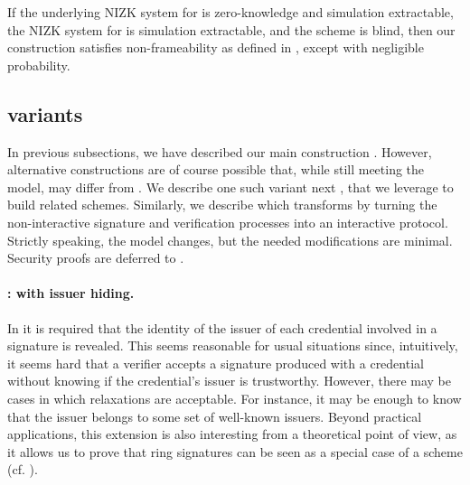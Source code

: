 
\begin{theorem}
  \label{thm:frame-uas}
  If the underlying NIZK system for \RelSig is zero-knowledge and simulation
  extractable, the NIZK system for \RelIns is simulation extractable, and the
  \SBCM scheme is blind, then our \CUASGen
  construction satisfies non-frameability as defined in ,
  except with negligible probability.
\end{theorem}

\subsection{\CUASGen variants}
\label{ssec:variants}

In previous subsections, we have described our main construction \CUASGen. 
However, alternative constructions are of course possible that, while
still meeting the \UAS model, may differ from \CUASGen. We describe one such
variant next \CUASGenHideIss, that we leverage to build related schemes.
%
Similarly, we describe \CUASGenInt which transforms \CUASGen by turning the
non-interactive signature and verification processes into an interactive
protocol. Strictly speaking, the model changes, but the needed modifications
are minimal.
%
Security proofs are deferred to .

\paragraph{\CUASGenHideIss: \RelSig with issuer hiding.} %
In \CUASGen it is required that the identity of the
issuer of each credential involved in a signature is revealed. This seems
reasonable for usual situations since, intuitively, it seems hard that a
verifier accepts a signature produced with a credential without knowing if the
credential's issuer is trustworthy. However, there may be cases in which
relaxations are acceptable. For instance, it may be enough to know that the
issuer belongs to some set of well-known issuers. Beyond practical applications,
this extension is also interesting from a theoretical point of view, as it
allows us to prove that ring signatures can be seen as a special case of a \UAS
scheme (cf. ). 

